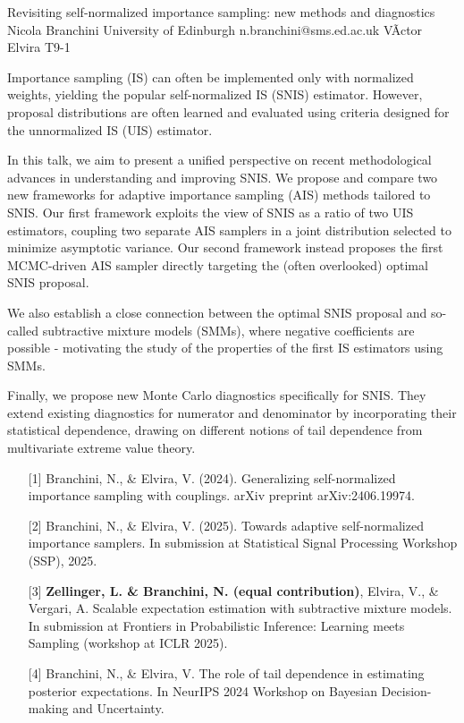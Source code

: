 \begin{talk}
  {Revisiting self-normalized importance sampling: new methods and diagnostics}%
  {Nicola Branchini}%
  {University of Edinburgh}%
  {n.branchini@sms.ed.ac.uk}%
  {VÃ­ctor Elvira}%
  {T9-1}%
			
Importance sampling (IS) can often be implemented only with normalized weights, yielding the popular self-normalized IS (SNIS) estimator. However, proposal distributions are often learned and evaluated using criteria designed for the unnormalized IS (UIS) estimator.

In this talk, we aim to present a unified perspective on recent methodological advances in understanding and improving SNIS.
We propose and compare two new frameworks for adaptive importance sampling (AIS) methods tailored to SNIS. Our first framework exploits the view of SNIS as a ratio of two UIS estimators, coupling two separate AIS samplers in a joint distribution selected to minimize asymptotic variance. Our second framework instead proposes the first MCMC-driven AIS sampler directly targeting the (often overlooked) optimal SNIS proposal.

We also establish a close connection between the optimal SNIS proposal and so-called subtractive mixture models (SMMs), where negative coefficients are possible - motivating the study of the properties of the first IS estimators using SMMs.

Finally, we propose new Monte Carlo diagnostics specifically for SNIS. They extend existing diagnostics for numerator and denominator by incorporating their statistical dependence, drawing on different notions of tail dependence from multivariate extreme value theory.

\medskip

\begin{enumerate}
	\item[{[1]}] Branchini, N., \& Elvira, V. (2024). Generalizing self-normalized importance sampling with couplings. arXiv preprint arXiv:2406.19974.
	\item[{[2]}] Branchini, N., \& Elvira, V. (2025). Towards adaptive self-normalized importance samplers. In submission at Statistical Signal Processing Workshop (SSP), 2025.
    \item[{[3]}] \textbf{Zellinger, L. \& Branchini, N. (equal contribution)}, Elvira, V., \& Vergari, A. Scalable expectation estimation with subtractive mixture models. In submission at Frontiers in Probabilistic Inference: Learning meets Sampling (workshop at ICLR 2025).
    \item[{[4]}] Branchini, N., \& Elvira, V. The role of tail dependence in estimating posterior expectations. In NeurIPS 2024 Workshop on Bayesian Decision-making and Uncertainty.


\end{enumerate}

\end{talk}

